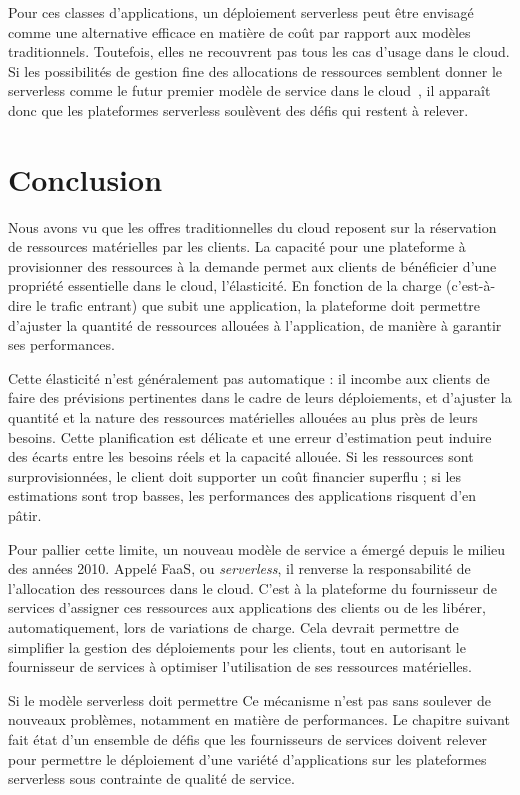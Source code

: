 Pour ces classes d'applications, un déploiement serverless peut être envisagé comme une alternative efficace en matière de coût par rapport aux modèles traditionnels. Toutefois, elles ne recouvrent pas tous les cas d'usage dans le cloud. Si les possibilités de gestion fine des allocations de ressources semblent donner le serverless comme le futur premier modèle de service dans le cloud~\cite{hellersteinServerlessComputingOne2019}, il apparaît donc que les plateformes serverless soulèvent des défis qui restent à relever.


\section{Conclusion}


Nous avons vu que les offres traditionnelles du cloud reposent sur la réservation de ressources matérielles par les clients. La capacité pour une plateforme à provisionner des ressources à la demande permet aux clients de bénéficier d'une propriété essentielle dans le cloud, l'élasticité. En fonction de la charge (c'est-à-dire le trafic entrant) que subit une application, la plateforme doit permettre d'ajuster la quantité de ressources allouées à l'application, de manière à garantir ses performances.

Cette élasticité n'est généralement pas automatique : il incombe aux clients de faire des prévisions pertinentes dans le cadre de leurs déploiements, et d'ajuster la quantité et la nature des ressources matérielles allouées au plus près de leurs besoins. Cette planification est délicate et une erreur d'estimation peut induire des écarts entre les besoins réels et la capacité allouée. Si les ressources sont surprovisionnées, le client doit supporter un coût financier superflu ; si les estimations sont trop basses, les performances des applications risquent d'en pâtir.

Pour pallier cette limite, un nouveau modèle de service a émergé depuis le milieu des années 2010. Appelé \gls{FaaS}, ou \textit{serverless}, il renverse la responsabilité de l'allocation des ressources dans le cloud. C'est à la plateforme du fournisseur de services d'assigner ces ressources aux applications des clients ou de les libérer, automatiquement, lors de variations de charge. Cela devrait permettre de simplifier la gestion des déploiements pour les clients, tout en autorisant le fournisseur de services à optimiser l'utilisation de ses ressources matérielles.

Si le modèle serverless doit permettre Ce mécanisme n'est pas sans soulever de nouveaux problèmes, notamment en matière de performances. Le chapitre suivant fait état d'un ensemble de défis que les fournisseurs de services doivent relever pour permettre le déploiement d'une variété d'applications sur les plateformes serverless sous contrainte de qualité de service.
